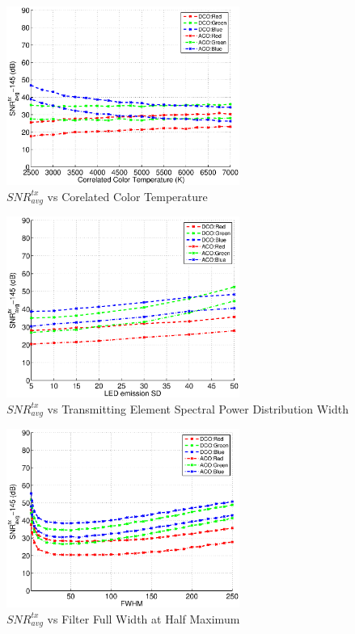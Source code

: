 \begin{figure}
	\centering
		\includegraphics[width=3in]{img/SNRvsCCT.eps}
	\caption{$SNR_{avg}^{tx}$ vs Corelated Color Temperature}
	\label{fig:SNRvsCCT}
\end{figure}

\begin{figure}
	\centering
		\includegraphics[width=3in]{img/SNRvsLEDSD.eps}
	\caption{$SNR_{avg}^{tx}$ vs Transmitting Element Spectral Power Distribution Width}
	\label{fig:SNRvsLEDSD}
\end{figure}

\begin{figure}
	\centering
		\includegraphics[width=3in]{img/SNRvsFLTWID.eps}
	\caption{$SNR_{avg}^{tx}$ vs Filter Full Width at Half Maximum}
	\label{fig:SNRvsFLTWID}
\end{figure}









